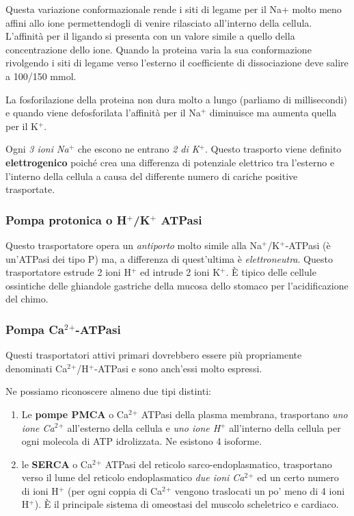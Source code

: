 \documentclass[]{article}
\begin{document}
Questa variazione conformazionale rende i siti di legame per il Na+
molto meno affini allo ione permettendogli di venire rilasciato
all'interno della cellula. L'affinità per il ligando si presenta con un
valore simile a quello della concentrazione dello ione. Quando la
proteina varia la sua conformazione rivolgendo i siti di legame verso
l'esterno il coefficiente di dissociazione deve salire a 100/150 mmol.

La fosforilazione della proteina non dura molto a lungo (parliamo di
millisecondi) e quando viene defosforilata l'affinità per il Na\(^+\)
diminuisce ma aumenta quella per il K\(^+\).

Ogni \emph{3 ioni Na\(^+\)} che escono ne entrano \emph{2 di K\(^+\)}.
Questo trasporto viene definito \textbf{elettrogenico} poiché crea una
differenza di potenziale elettrico tra l'esterno e l'interno della
cellula a causa del differente numero di cariche positive trasportate.

\subsubsection{\texorpdfstring{Pompa protonica o H\(^+\)/K\(^+\)
ATPasi}{Pompa protonica o H\^{}+/K\^{}+ ATPasi}}\label{pompa-protonica-o-hk-atpasi}

Questo trasportatore opera un \emph{antiporto} molto simile alla
Na\(^+\)/K\(^+\)-ATPasi (è un'ATPasi dei tipo P) ma, a differenza di
quest'ultima è \emph{elettroneutra}. Questo trasportatore estrude 2 ioni
H\(^+\) ed intrude 2 ioni K\(^+\). È tipico delle cellule ossintiche
delle ghiandole gastriche della mucosa dello stomaco per
l'acidificazione del chimo.

\subsubsection{\texorpdfstring{Pompa
Ca\(^2\)\(^+\)-ATPasi}{Pompa Ca\^{}2\^{}+-ATPasi}}\label{pompa-ca2-atpasi}

Questi trasportatori attivi primari dovrebbero essere più propriamente
denominati Ca\(^2\)\(^+\)/H\(^+\)-ATPasi e sono anch'essi molto
espressi.

Ne possiamo riconoscere almeno due tipi distinti:

\begin{enumerate}
\def\labelenumi{\arabic{enumi}.}
\itemsep1pt\parskip0pt
\item
  Le \textbf{pompe PMCA} o Ca\(^2\)\(^+\) ATPasi della plasma membrana,
  trasportano \emph{uno ione Ca\(^2\)\(^+\)} all'esterno della cellula e
  \emph{uno ione H\(^+\)} all'interno della cellula per ogni molecola di
  ATP idrolizzata. Ne esistono 4 isoforme.
\item
  le \textbf{SERCA} o Ca\(^2\)\(^+\) ATPasi del reticolo
  sarco-endoplasmatico, trasportano verso il lume del reticolo
  endoplasmatico \emph{due ioni Ca\(^2\)\(^+\)} ed un certo numero di
  ioni H\(^+\) (per ogni coppia di Ca\(^2\)\(^+\) vengono traslocati un
  po' meno di 4 ioni H\(^+\)). È il principale sistema di omeostasi del
  muscolo scheletrico e cardiaco.
\end{enumerate}
\end{document}
